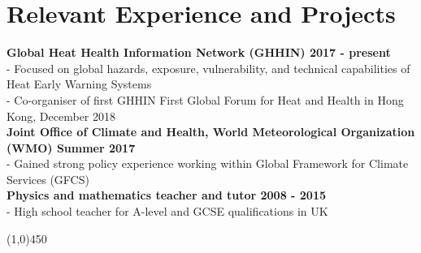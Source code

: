 \section*{Relevant Experience and Projects}

\noindent \textbf{Global Heat Health Information Network (GHHIN) \hfill 2017 - present}\\
- Focused on global hazards, exposure, vulnerability, and technical capabilities of Heat Early Warning Systems\\
- Co-organiser of first GHHIN First Global Forum for Heat and Health in Hong Kong, December 2018\\

\noindent \textbf{Joint Office of Climate and Health, World Meteorological Organization (WMO) \hfill Summer 2017}\\
\noindent - Gained strong policy experience working within Global Framework for Climate Services (GFCS)\\

\noindent \textbf{Physics and mathematics teacher and tutor \hfill 2008 - 2015}\\
- High school teacher for A-level and GCSE qualifications in UK

\begin{center} \line(1,0){450} \end{center}